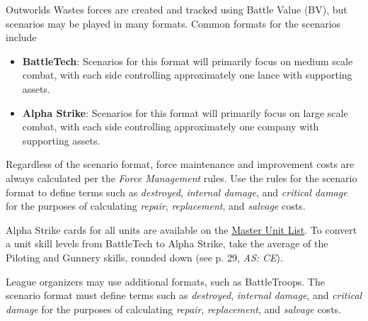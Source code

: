Outworlds Wastes forces are created and tracked using Battle Value (BV), but scenarios may be played in many formats.
Common formats for the scenarios include

\begin{itemize}

\item {\bfseries BattleTech}: Scenarios for this format will primarily focus on medium scale combat, with each side controlling approximately one lance with supporting assets.

\item {\bfseries Alpha Strike}: Scenarios for this format will primarily focus on large scale combat, with each side controlling approximately one company with supporting assets.

\end{itemize}

Regardless of the scenario format, force maintenance and improvement costs are always calculated per the \emph{Force Management} rules.
Use the rules for the scenario format to define terms such as \emph{destroyed}, \emph{internal damage}, and \emph{critical damage} for the purposes of calculating \emph{repair}, \emph{replacement}, and \emph{salvage} costs.

Alpha Strike cards for all units are available on the \href{http://www.masterunitlist.info}{Master Unit List}.
To convert a unit skill levels from BattleTech to Alpha Strike, take the average of the Piloting and Gunnery skills, rounded down (see p. 29, \emph{AS: CE}).

League organizers may use additional formats, such as BattleTroops.
The scenario format must define terms such as \emph{destroyed}, \emph{internal damage}, and \emph{critical damage} for the purposes of calculating \emph{repair}, \emph{replacement}, and \emph{salvage} costs.
